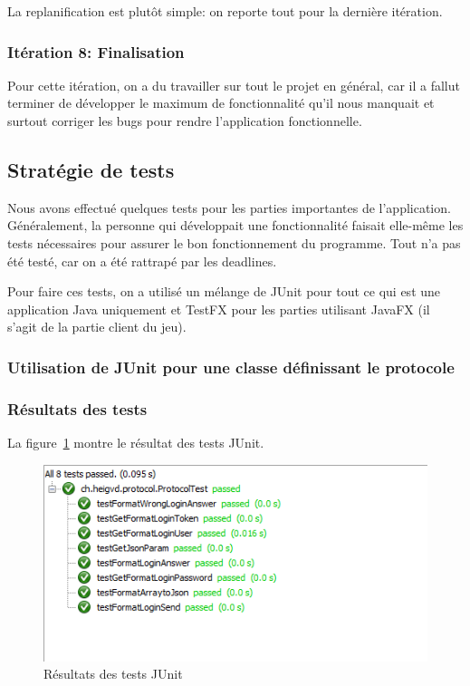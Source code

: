\documentclass[a4paper,12pt]{article}
\begin{document}
	La replanification est plutôt simple: on reporte tout pour la dernière itération.
	
	\subsubsection{Itération 8: Finalisation}
	Pour cette itération, on a du travailler sur tout le projet en général, car il a fallut terminer de développer le maximum de fonctionnalité qu'il nous manquait et surtout corriger les bugs pour rendre l'application fonctionnelle. 
	
	
	\subsection{Stratégie de tests}
	Nous avons effectué quelques tests pour les parties importantes de l'application. Généralement, la personne qui développait une fonctionnalité faisait elle-même les tests nécessaires pour assurer le bon fonctionnement du programme. Tout n'a pas été testé, car on a été rattrapé par les deadlines. 
	
	Pour faire ces tests, on a utilisé un mélange de JUnit pour tout ce qui est une application Java uniquement et TestFX pour les parties utilisant JavaFX (il s'agit de la partie client du jeu).
	
	\subsubsection{Utilisation de JUnit pour une classe définissant le protocole}
	
	
	\subsubsection{Résultats des tests}
	La figure~\ref{fig:resTests} montre le résultat des tests JUnit.
	\begin{figure}[ht]
		\centering
		\includegraphics{tests.PNG}
		\caption{Résultats des tests JUnit}
		\label{fig:resTests}
	\end{figure}
	
\end{document}

